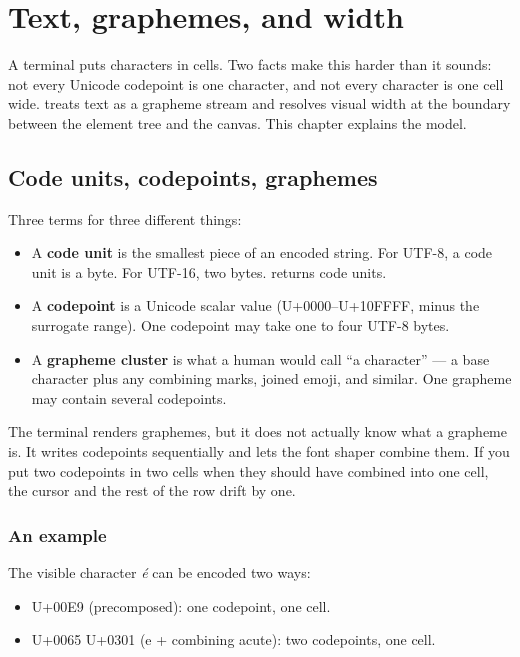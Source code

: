 \chapter{Text, graphemes, and width}
\label{ch:text}

\begin{aside}
A terminal puts characters in cells. Two facts make this harder
than it sounds: not every Unicode codepoint is one character, and
not every character is one cell wide. \maya{} treats text as a
grapheme stream and resolves visual width at the boundary between
the element tree and the canvas. This chapter explains the model.
\end{aside}

\section{Code units, codepoints, graphemes}

Three terms for three different things:

\begin{itemize}[leftmargin=*]
  \item A \textbf{code unit} is the smallest piece of an encoded
    string. For UTF-8, a code unit is a byte. For UTF-16, two
    bytes.  returns code units.
  \item A \textbf{codepoint} is a Unicode scalar value
    (U+0000--U+10FFFF, minus the surrogate range). One codepoint
    may take one to four UTF-8 bytes.
  \item A \textbf{grapheme cluster} is what a human would call ``a
    character'' --- a base character plus any combining marks,
    joined emoji, and similar. One grapheme may contain several
    codepoints.
\end{itemize}

The terminal renders graphemes, but it does not actually know what
a grapheme is. It writes codepoints sequentially and lets the
font shaper combine them. If you put two codepoints in two cells
when they should have combined into one cell, the cursor and the
rest of the row drift by one.

\subsection*{An example}

The visible character \emph{é} can be encoded two ways:

\begin{itemize}[leftmargin=*]
  \item U+00E9 (precomposed): one codepoint, one cell.
  \item U+0065 U+0301 (e + combining acute): two codepoints, one
    cell.
\end{itemize}

